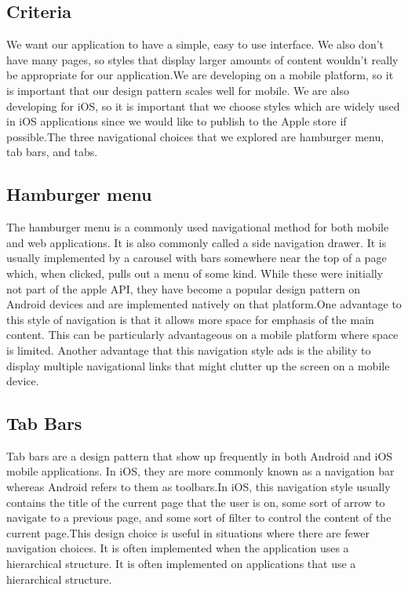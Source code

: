 \documentclass[onecolumn, draftclsnofoot,10pt, compsoc]{IEEEtran}
\begin{document}
  \subsection{Criteria}
    We want our application to have a simple, easy to use interface. We also don't have many pages, so styles that display larger amounts of content wouldn't really be appropriate for our application.We are developing on a mobile platform, so it is important that our design pattern scales well for mobile. We are also developing for iOS, so it is important that we choose styles which are widely used in iOS applications since we would like to publish to the Apple store if possible.The three navigational choices that we explored are hamburger menu, tab bars, and tabs.
    \subsection{Hamburger menu}
    The hamburger menu is a commonly used navigational method for both mobile and web applications. It is also commonly called a side navigation drawer. It is usually implemented by a carousel with bars somewhere near the top of a page which, when clicked, pulls out a menu of some kind. While these were initially not part of the apple API, they have become a popular design pattern on Android devices and are implemented natively on that platform.One advantage to this style of navigation is that it allows more space for emphasis of the main content. This can be particularly advantageous on a mobile platform where space is limited. Another advantage that this navigation style ads is the ability to display multiple navigational links that might clutter up the screen on a mobile device.\cite{Hamburger Menu}
    \subsection{Tab Bars}
    Tab bars are a design pattern that show up frequently in both Android and iOS mobile applications. In iOS, they are more commonly known as a navigation bar whereas Android refers to them as toolbars.In iOS, this navigation style usually contains the title of the current page that the user is on, some sort of arrow to navigate to a previous page, and some sort of filter to control the content of the current page.This design choice is useful in situations where there are fewer navigation choices. It is often implemented when the application uses a hierarchical structure. It is often implemented on applications that use a hierarchical structure. \cite{Comparison}
\end{document}
